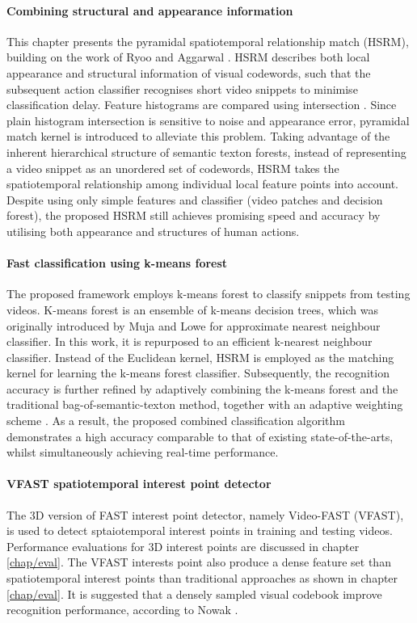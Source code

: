 \paragraph{Combining structural and appearance information} This chapter presents the pyramidal spatiotemporal relationship match (HSRM), building on the work of Ryoo and Aggarwal \cite{Ryoo2009}. HSRM describes both local appearance and structural information of visual codewords, such that the subsequent action classifier recognises short video snippets to minimise classification delay. Feature histograms are compared using intersection \cite{Ryoo2009}. Since plain histogram intersection is sensitive to noise and appearance error, pyramidal match kernel \cite{Grauman2005} is introduced to alleviate this problem. Taking advantage of the inherent hierarchical structure of semantic texton forests, instead of representing a video snippet as an unordered set of codewords, HSRM takes the spatiotemporal relationship among individual local feature points into account. Despite using only simple features and classifier (video patches and decision forest), the proposed HSRM still achieves promising speed and accuracy by utilising both appearance and structures of human actions. 


\paragraph{Fast classification using k-means forest} The proposed framework employs k-means forest to classify snippets from testing videos. K-means forest is an ensemble of k-means decision trees, which was originally introduced by Muja and Lowe \cite{Muja2009} for approximate nearest neighbour classifier. In this work, it is repurposed to an efficient k-nearest neighbour classifier. Instead of the Euclidean kernel, HSRM is employed as the matching kernel for learning the k-means forest classifier. Subsequently, the recognition accuracy is further refined by adaptively combining the k-means forest and the traditional bag-of-semantic-texton method, together with an adaptive weighting scheme \cite{Shotton2008}. As a result, the proposed combined classification algorithm demonstrates a high accuracy comparable to that of existing state-of-the-arts, whilst simultaneously achieving real-time performance. 

\paragraph{VFAST spatiotemporal interest point detector} The 3D version of FAST interest point detector, namely Video-FAST (VFAST), is used to detect sptaiotemporal interest points in training and testing videos. Performance evaluations for 3D interest points are discussed in chapter \ref{chap/eval}. The VFAST interests point also produce a dense feature set than spatiotemporal interest points than traditional approaches as shown in chapter \ref{chap/eval}. It is suggested that a densely sampled visual codebook improve recognition performance, according to Nowak \etal \cite{Nowak2006}.


